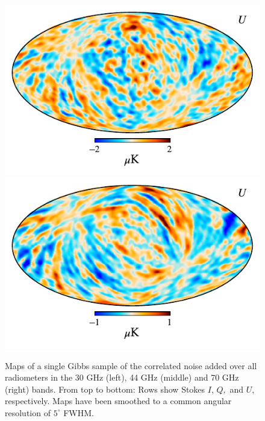\documentclass{aa}
\begin{document}
\begin{figure}
\begin{center}
                \includegraphics[width=0.33\linewidth]{figs/ncorr_044_U.pdf}
                \includegraphics[width=0.33\linewidth]{figs/ncorr_070_U.pdf}
        \end{center}
        \caption{Maps of a single Gibbs sample of the correlated noise
                added over all radiometers in the 30 GHz (left), 44 GHz
                (middle) and 70 GHz (right) bands. From top to bottom: Rows show Stokes $I$, $Q,$
                and $U$, respectively. Maps have been smoothed to a common angular resolution
                of $5^{\circ}$ FWHM. 
                \label{fig:ncorr_map}}
\end{figure}
\end{document}
